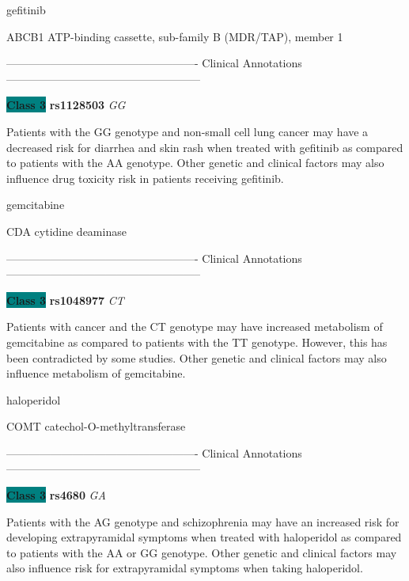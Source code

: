 \documentclass{resume} %
\begin{document}
\begin{rSection}{ gefitinib }
\begin{rSubsection}{ ABCB1 }{ ATP-binding cassette, sub-family B (MDR/TAP), member 1 }{}{}
\item[] ---------------------------------------------------- Clinical Annotations -----------------------------------------------------\newline
\item \textbf{\colorbox{teal} {Class 3}} \textbf{ rs1128503 } \textit{ GG }
\item[] Patients with the GG genotype and non-small cell lung cancer may have a decreased risk for diarrhea and skin rash when treated with gefitinib as compared to patients with the AA genotype. Other genetic and clinical factors may also influence drug toxicity risk in patients receiving gefitinib.
\end{rSubsection}

\end{rSection}\begin{rSection}{ gemcitabine }
\item[]

\begin{rSubsection}{ CDA }{ cytidine deaminase }{}{}
\item[]

\item[] ---------------------------------------------------- Clinical Annotations -----------------------------------------------------\newline
\item \textbf{\colorbox{teal} {Class 3}} \textbf{ rs1048977 } \textit{ CT }
\item[] Patients with cancer and the CT genotype may have increased metabolism of gemcitabine as compared to patients with the TT genotype. However, this has been contradicted by some studies. Other genetic and clinical factors may also influence metabolism of gemcitabine. 
\end{rSubsection}

\end{rSection}\begin{rSection}{ haloperidol }
\item[]

\begin{rSubsection}{ COMT }{ catechol-O-methyltransferase }{}{}
\item[]

\item[] ---------------------------------------------------- Clinical Annotations -----------------------------------------------------\newline
\item \textbf{\colorbox{teal} {Class 3}} \textbf{ rs4680 } \textit{ GA }
\item[] Patients with the AG genotype and schizophrenia may have an increased risk for developing extrapyramidal symptoms when treated with haloperidol as compared to patients with the AA or GG genotype. Other genetic and clinical factors may also influence risk for extrapyramidal symptoms when taking haloperidol.
\end{rSubsection}


\end{rSection}
\end{document}
